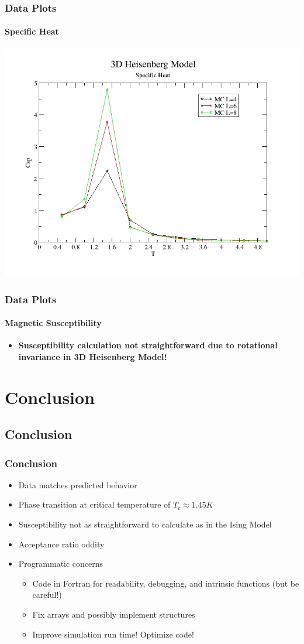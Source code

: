 \documentclass{beamer}
\begin{document}
  \begin{frame}
  	\frametitle{Data Plots}
    \framesubtitle{Specific Heat}
    \center \includegraphics[scale=0.3]{c}
  \end{frame}
  \begin{frame}
  	\frametitle{Data Plots}
    \framesubtitle{Magnetic Susceptibility}
    \begin{itemize}
    	\item \textbf{Susceptibility calculation not straightforward due to rotational invariance in 3D Heisenberg Model!}
    \end{itemize}
  \end{frame}
  
  \section{Conclusion}
  \subsection*{Conclusion}
  \begin{frame}
    \frametitle{Conclusion}
    \begin{itemize}
      \item Data matches predicted behavior
      \item Phase transition at critical temperature of $T_c \approx 1.45 K$
    	\item Susceptibility not as straightforward to calculate as in the Ising Model
    	\item Acceptance ratio oddity
    	\item Programmatic concerns
    	\begin{itemize}
    		\item Code in Fortran for readability, debugging, and intrinsic functions (but be careful!)
    		\item Fix arrays and possibly implement structures
    		\item Improve simulation run time! Optimize code!
    	\end{itemize}
    \end{itemize}
  \end{frame}
  
\end{document}
